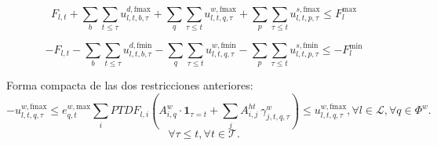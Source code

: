 \begin{dmath}
F_{l, t} + \sum_{b}\sum_{t \leq \tau} u^{d,\text{fmax}}_{l,t,b,\tau} + \sum_{q} \sum_{\tau \leq t}u^{w,\text{fmax}}_{l,t,q,\tau}+ \sum_{p} \sum_{\tau \leq t} u^{s,\text{fmax}}_{l,t,p,\tau} \leq F_{l}^{\text{max}}
\end{dmath}

\begin{dmath}
- F_{l, t} - \sum_{b}\sum_{t \leq \tau} u^{d,\text{fmin}}_{l,t,b,\tau} - \sum_{q} \sum_{\tau \leq t}u^{w,\text{fmin}}_{l,t,q,\tau} - \sum_{p} \sum_{\tau \leq t} u^{s,\text{fmin}}_{l,t,p,\tau} \leq  - F_{l}^{\text{min}}
\end{dmath}





Forma compacta de las dos restricciones anteriores:
\begin{equation}
-u_{l,t,q,\tau}^{w,\text{fmax}} \le e_{q,t}^{w, \text{max}} \sum_{i}PTDF_{l,i} \left( A_{i,q}^w \cdot \mathbf{1}_{\tau = t} + \sum_{j}A_{i,j}^{ht} \: \gamma_{j,t,q,\tau}^{w} \right) \le u_{l,t,q,\tau}^{w,\text{fmax}} , \forall l \in \mathcal{L}, \forall q \in \Phi^{w}.
\end{equation}
\begin{equation*}
    \forall \tau \leq t, \forall t \in \mathcal{T}.
\end{equation*}

